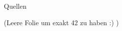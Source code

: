 \begin{frame}{Quellen}
\begin{thebibliography}{10}
%
%
%
    \end{thebibliography}

\end{frame}


\begin{frame}[c]
    (Leere Folie um exakt 42 zu haben :) )
\end{frame}
